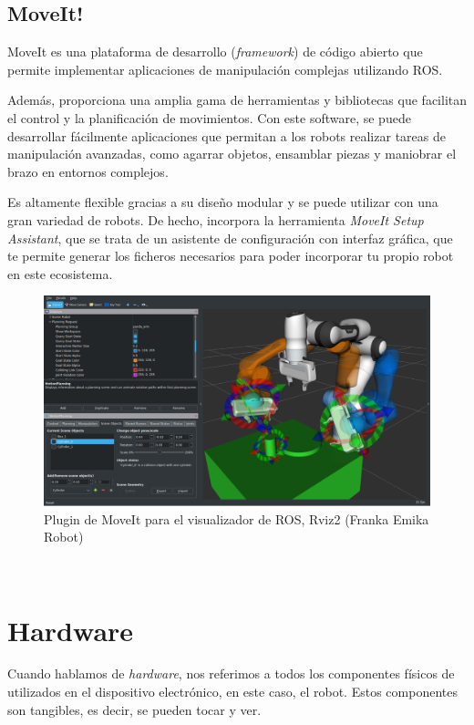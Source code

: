 \subsection{MoveIt!}
\label{subsec:moveit}
MoveIt es una plataforma de desarrollo (\textit{framework}) de código abierto que permite implementar 
aplicaciones de manipulación complejas utilizando ROS. 

Además, proporciona una amplia gama de herramientas y bibliotecas que 
facilitan el control y la planificación de movimientos. Con este software, se puede desarrollar fácilmente aplicaciones que permitan
a los robots realizar tareas de manipulación avanzadas, como agarrar objetos, ensamblar piezas y maniobrar el brazo en entornos complejos. 

Es altamente flexible gracias a su diseño modular y se puede utilizar con una gran variedad de robots. De hecho, incorpora la herramienta 
\textit{MoveIt Setup Assistant}, que se trata de un asistente de configuración con interfaz gráfica, que te permite generar los ficheros 
necesarios para poder incorporar tu propio robot en este ecosistema. 
\begin{figure} [h!]
  \begin{center}
    \includegraphics[width=14cm]{figs/moveit_intro.png}
  \end{center}
  \caption{Plugin de MoveIt para el visualizador de ROS, Rviz2 (Franka Emika Robot)}
  \label{fig:ros2logo}
\end{figure}\ 

\newpage
\section{Hardware}
\label{sec:hardware}
Cuando hablamos de \textit{hardware}, nos referimos a todos los componentes físicos de utilizados en el dispositivo electrónico, en este caso, el robot. Estos 
componentes son tangibles, es decir, se pueden tocar y ver.

